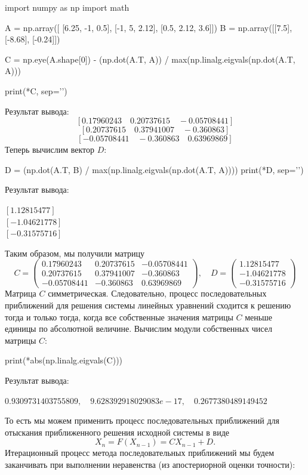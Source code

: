 \documentclass[a4paper, 12pt]{report}
\begin{document}
	\begin{python}
		import numpy as np
		import math
		
		A = np.array([
		[6.25, -1, 0.5],
		[-1, 5, 2.12],
		[0.5, 2.12, 3.6]])
		B = np.array([[7.5], [-8.68], [-0.24]])
		
		C = np.eye(A.shape[0]) - (np.dot(A.T, A)) / max(np.linalg.eigvals(np.dot(A.T, A)))
		
		print(*C, sep='\n')\end{python}
	Результат вывода:
	$$[ 0.17960243\quad  0.20737615\quad -0.05708441]$$
	$$[ 0.20737615\quad  0.37941007\quad -0.360863  ]$$
	$$[-0.05708441\quad -0.360863\quad    0.63969869]$$
	Теперь вычислим вектор $D$:
	\begin{python}
		D = (np.dot(A.T, B) / max(np.linalg.eigvals(np.dot(A.T, A))))
		print(*D, sep='\n')\end{python}
	Результат вывода: \begin{center}
		$[1.12815477]$\\
		$[-1.04621778]$\\
		$[-0.31575716]$
	\end{center}
	Таким образом, мы получили матрицу $$C = \begin{pmatrix}
		0.17960243 &  0.20737615 & -0.05708441\\
		0.20737615 &  0.37941007 & -0.360863\\
		-0.05708441 & -0.360863 & 0.63969869
	\end{pmatrix},\quad D = \begin{pmatrix}
	1.12815477\\
	-1.04621778\\
	-0.31575716
	\end{pmatrix}$$
	Матрица $C$ симметрическая. Следовательно, процесс последовательных приближений для решения системы линейных уравнений сходится к решению тогда и только тогда, когда все собственные значения матрицы $C$ меньше единицы по абсолютной величине.
	Вычислим модули собственных чисел матрицы $C$:
	\begin{python}
		print(*abs(np.linalg.eigvals(C)))\end{python}
	Результат вывода:
	\begin{center}
		$0.9309731403755809,\quad 9.628392918029083e-17,\quad 0.2677380489149452$
	\end{center}
	То есть мы можем применить процесс последовательных приближений для отыскания приближенного решения исходной системы в виде $$X_n = F(X_{n-1}) = CX_{n-1} + D.$$
	Итерационный процесс метода последовательных приближений мы будем заканчивать при выполнении неравенства (из апостериорной оценки точности):
\end{document}
